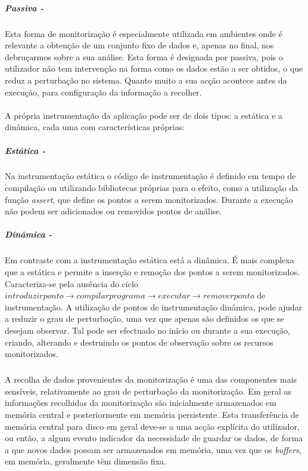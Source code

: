 \subparagraph*{Passiva - }
Esta forma de monitorização é especialmente utilizada em ambientes onde é relevante a obtenção de um conjunto fixo de dados e, apenas no final, nos debruçarmos sobre a sua análise.
Esta forma é designada por passiva, pois o utilizador não tem intervenção na forma como os dados estão a ser obtidos, o que reduz a perturbação no sistema.
Quanto muito a sua acção acontece antes da execução, para configuração da informação a recolher.

\paragraph*{}
A própria instrumentação da aplicação pode ser de dois tipos: a estática e a dinâmica, cada uma com características próprias:

\subparagraph*{Estática - }

Na instrumentação estática o código de instrumentação é definido em tempo de compilação ou utilizando bibliotecas próprias para o efeito, como a utilização da função \textit{assert}, que define os pontos a serem monitorizados.
Durante a execução não podem ser adicionados ou removidos pontos de análise.

\subparagraph*{Dinâmica - }

Em contraste com a instrumentação estática está a dinâmica.
É mais complexa que a estática e permite a inserção e remoção dos pontos a serem monitorizados.
Caracteriza-se pela ausência do ciclo $introduzir ponto\rightarrow compilar programa\rightarrow executar\rightarrow remover ponto$ de instrumentação.
A utilização de pontos de instrumentação dinâmica, pode ajudar a reduzir o grau de perturbação, uma vez que apenas são definidos os que se desejam observar.
Tal pode ser efectuado no início ou durante a sua execução, criando, alterando e destruindo os pontos de observação sobre os recursos monitorizados.


\subparagraph*{
}
A recolha de dados provenientes da monitorização é uma das componentes mais sensíveis, relativamente ao grau de perturbação da monitorização.
Em geral as informações recolhidas da monitorização são inicialmente armazenados em memória central e posteriormente em memória persistente.
Esta transferência de memória central para disco em geral deve-se a uma acção explícita do utilizador, ou então, a algum evento indicador da necessidade de guardar os dados, de forma a que novos dados possam ser armazenados em memória, uma vez que os \textit{buffers}, em memória, geralmente têm dimensão fixa.

